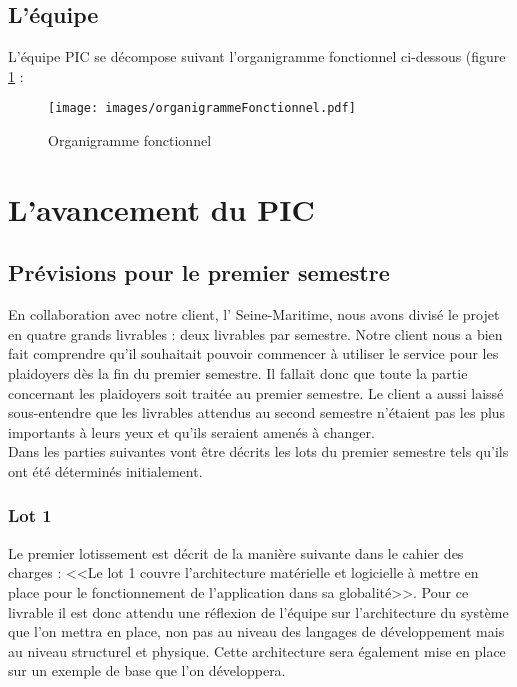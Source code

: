 \documentclass[asi]{picInsa}
\begin{document}
\section{L'équipe}
L'équipe PIC se décompose suivant l'organigramme fonctionnel ci-dessous (figure \ref{organigramme} :
\begin{figure}[!h]
	\begin{center}
	\texttt{[image: images/organigrammeFonctionnel.pdf]}
	\label{organigramme}
	\caption{Organigramme fonctionnel}
	\end{center}
\end{figure} 





\chapter{L'avancement du PIC}
\label{avancement}

\section{Prévisions pour le premier semestre}
En collaboration avec notre client, l'\nomClient{} Seine-Maritime, nous avons divisé le projet en quatre grands livrables : deux livrables par semestre. Notre client nous a bien fait comprendre qu'il souhaitait pouvoir commencer à utiliser le service pour les plaidoyers dès la fin du premier semestre. Il fallait donc que toute la partie concernant les plaidoyers soit traitée au premier semestre. Le client a aussi laissé sous-entendre que les livrables attendus au second semestre n'étaient pas les plus importants à leurs yeux et qu'ils seraient amenés à changer.\vspace{0.5cm}\\
Dans les parties suivantes vont être décrits les lots du premier semestre tels qu'ils ont été déterminés initialement.

\subsection{Lot 1}
Le premier lotissement est décrit de la manière suivante dans le cahier des charges : <<Le lot 1 couvre l'architecture matérielle et logicielle à mettre en place pour le fonctionnement de l'application dans sa globalité>>. Pour ce livrable il est donc attendu une réflexion de l'équipe sur l'architecture du système que l'on mettra en place, non pas au niveau des langages de développement mais au niveau structurel et physique. Cette architecture sera également mise en place sur un exemple de base que l'on développera.
\end{document}
